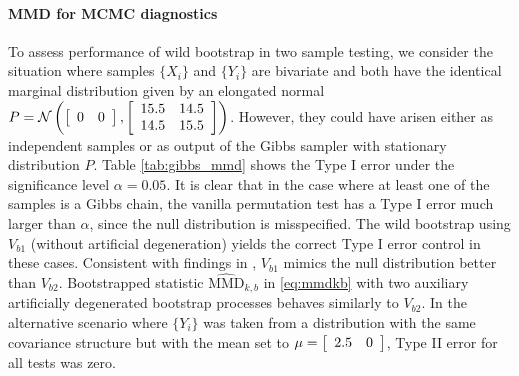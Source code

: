 \documentclass{article} %
\begin{document}
\paragraph{MMD for MCMC diagnostics}
To assess performance of wild bootstrap in two sample testing, we consider the situation where samples $\{X_i\}$ and $\{Y_i\}$ are bivariate and both have the identical marginal distribution given by an elongated normal
$P=\mathcal{N}\left(\left[\protect\begin{array}{cc}
0 & 0\protect\end{array}\right],\left[\protect\begin{array}{cc}
15.5 & 14.5\protect\\
14.5 & 15.5
\protect\end{array}\right]\right)$.
However, they could have arisen either as independent samples or as output of the Gibbs sampler with stationary distribution $P$. 
Table \ref{tab:gibbs_mmd} shows the Type I error under the significance level $\alpha=0.05$. It is clear that in the case where at least one of the samples is a Gibbs chain, the vanilla permutation test has a Type I error much larger than $\alpha$, since the null distribution is misspecified. 
The wild bootstrap using $V_{b1}$ (without artificial degeneration) yields the correct Type I error control in these cases. Consistent with findings in \cite[Section 5]{leucht_dependent_2013}, $V_{b1}$ mimics the null distribution better than $V_{b2}$. Bootstrapped statistic $\widehat{\text{MMD}}_{k,b}$ in \eqref{eq:mmdkb} with two auxiliary artificially degenerated bootstrap processes behaves similarly to $V_{b2}$.
In the alternative scenario where $\{Y_i\}$ was taken from a distribution with the same covariance structure but with the mean set to $\mu= \left[\protect\begin{array}{cc}
2.5 & 0\protect\end{array}\right]$, Type II error for all tests was zero.
\end{document}
